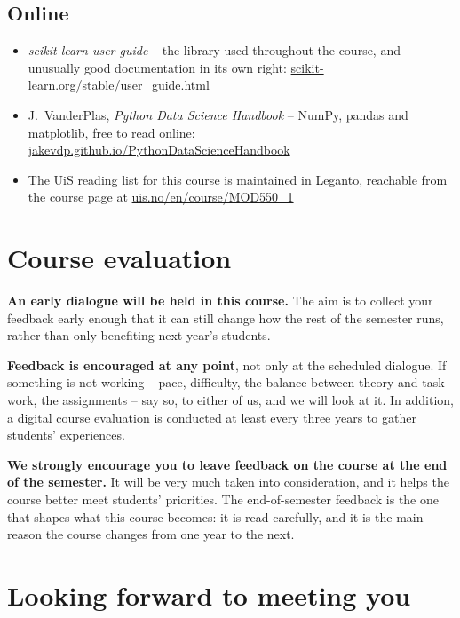 \documentclass[letterpaper,12pt,oneside]{article}
\begin{document}
\subsection*{Online}

\begin{itemize}
\item \textit{scikit-learn user guide} -- the library used throughout the course, and unusually good documentation in its own right: \href{https://scikit-learn.org/stable/user_guide.html}{scikit-learn.org/stable/user\_guide.html}
\item J.~VanderPlas, \textit{Python Data Science Handbook} -- NumPy, pandas and matplotlib, free to read online: \href{https://jakevdp.github.io/PythonDataScienceHandbook/}{jakevdp.github.io/PythonDataScienceHandbook}
\item The UiS reading list for this course is maintained in Leganto, reachable from the course page at \href{https://www.uis.no/en/course/MOD550_1}{uis.no/en/course/MOD550\_1}
\end{itemize}


\section*{Course evaluation}

\textbf{An early dialogue will be held in this course.} The aim is to collect your feedback early enough that it can still change how the rest of the semester runs, rather than only benefiting next year's students.

\textbf{Feedback is encouraged at any point}, not only at the scheduled dialogue. If something is not working -- pace, difficulty, the balance between theory and task work, the assignments -- say so, to either of us, and we will look at it. In addition, a digital course evaluation is conducted at least every three years to gather students' experiences.

\textbf{We strongly encourage you to leave feedback on the course at the end of the semester.} It will be very much taken into consideration, and it helps the course better meet students' priorities. The end-of-semester feedback is the one that shapes what this course becomes: it is read carefully, and it is the main reason the course changes from one year to the next.


\vspace{3em}
\section*{Looking forward to meeting you}
\end{document}
